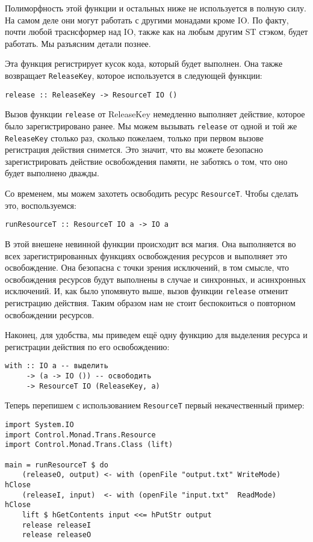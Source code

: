 \begin{remark}
Полиморфность этой функции и остальных ниже не используется в полную силу. На самом деле
они могут работать с другими монадами кроме IO. По факту, почти любой траснсформер над
IO, также как на любым другим ST стэком, будет работать. Мы разъясним детали познее.
\end{remark}

Эта функция регистрирует кусок кода, который будет выполнен. Она также
возвращает \lstinline'ReleaseKey', которое используется в следующей функции:

\begin{lstlisting}
release :: ReleaseKey -> ResourceT IO ()
\end{lstlisting}
Вызов функции \verb=release= от ReleaseKey немедленно выполняет действие, которое было
зарегистрировано ранее. Мы можем вызывать \verb=release= от одной и той же
\lstinline'ReleaseKey'
столько раз, сколько пожелаем, только при первом вызове регистрация действия снимется. Это
значит, что вы можете безопасно зарегистрировать действие освобождения памяти, не
заботясь о том, что оно будет выполнено дважды.

Со временем, мы можем захотеть освободить ресурс \lstinline'ResourceT'. Чтобы сделать это,
воспользуемся:
\begin{lstlisting}
runResourceT :: ResourceT IO a -> IO a
\end{lstlisting}
В этой внешене невинной функции происходит вся магия. Она выполняется во всех
зарегистрированных функциях освобождения ресурсов и выполняет это освобождение. 
Она безопасна с точки зрения исключений, в
том смысле, что освобождения ресурсов будут выполнены в случае и синхронных, и
асинхронных исключений. И, как было упомянуто выше, вызов функции \lstinline'release'
отменит
регистрацию действия. Таким образом нам не стоит беспокоиться о повторном освобождении
ресурсов.

Наконец, для удобства, мы приведем ещё одну функцию для выделения ресурса и регистрации
действия по его освобождению:
\begin{lstlisting}
with :: IO a -- выделить
     -> (a -> IO ()) -- освободить
     -> ResourceT IO (ReleaseKey, a)
\end{lstlisting}

Теперь перепишем с использованием \lstinline'ResourceT' первый некачественный пример:
\begin{lstlisting}
import System.IO
import Control.Monad.Trans.Resource
import Control.Monad.Trans.Class (lift)

main = runResourceT $ do
    (releaseO, output) <- with (openFile "output.txt" WriteMode) hClose
    (releaseI, input)  <- with (openFile "input.txt"  ReadMode)  hClose
    lift $ hGetContents input <<= hPutStr output
    release releaseI
    release releaseO
\end{lstlisting}

